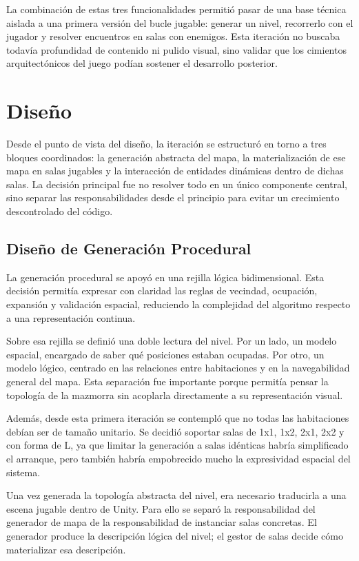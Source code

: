 La combinación de estas tres funcionalidades permitió pasar de una base técnica aislada a
una primera versión del bucle jugable: generar un nivel, recorrerlo con el jugador y
resolver encuentros en salas con enemigos. Esta iteración no buscaba todavía profundidad
de contenido ni pulido visual, sino validar que los cimientos arquitectónicos del juego
podían sostener el desarrollo posterior.

\section{Diseño}
Desde el punto de vista del diseño, la iteración se estructuró en torno a tres bloques
coordinados: la generación abstracta del mapa, la materialización de ese mapa en salas
jugables y la interacción de entidades dinámicas dentro de dichas salas. La decisión
principal fue no resolver todo en un único componente central, sino separar las
responsabilidades desde el principio para evitar un crecimiento descontrolado del código.

\subsection{Diseño de Generación Procedural}
La generación procedural se apoyó en una rejilla lógica bidimensional. Esta decisión
permitía expresar con claridad las reglas de vecindad, ocupación, expansión y validación
espacial, reduciendo la complejidad del algoritmo respecto a una representación continua.

Sobre esa rejilla se definió una doble lectura del nivel. Por un lado, un modelo espacial,
encargado de saber qué posiciones estaban ocupadas. Por otro, un modelo lógico, centrado
en las relaciones entre habitaciones y en la navegabilidad general del mapa. Esta
separación fue importante porque permitía pensar la topología de la mazmorra sin acoplarla
directamente a su representación visual.

Además, desde esta primera iteración se contempló que no todas las habitaciones debían ser
de tamaño unitario. Se decidió soportar salas de 1x1, 1x2, 2x1, 2x2 y con forma de L, ya
que limitar la generación a salas idénticas habría simplificado el arranque, pero también
habría empobrecido mucho la expresividad espacial del sistema.

Una vez generada la topología abstracta del nivel, era necesario traducirla a una escena
jugable dentro de Unity. Para ello se separó la responsabilidad del generador de mapa de la
responsabilidad de instanciar salas concretas. El generador produce la descripción lógica
del nivel; el gestor de salas decide cómo materializar esa descripción.

